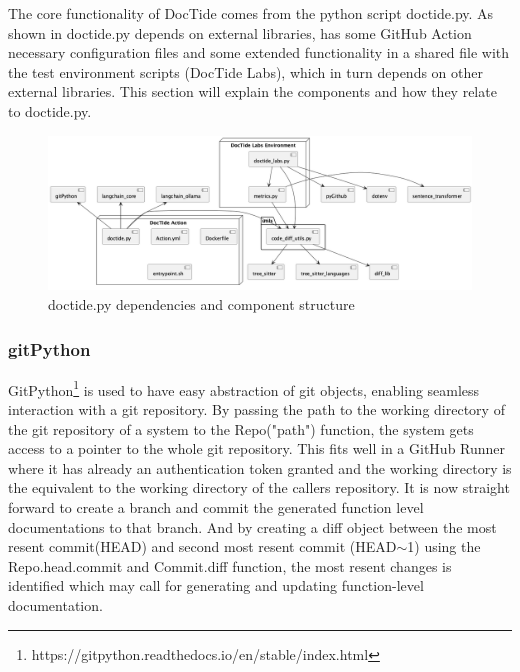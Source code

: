 The core functionality of DocTide comes from the python script doctide.py. As shown in  doctide.py depends on external libraries, has some GitHub Action necessary configuration files and some extended functionality in a shared file with the test environment scripts (DocTide Labs), which in turn depends on other external libraries. This section will explain the components and how they relate to doctide.py.

\begin{figure}[H]
\centering
\includegraphics[width=1\linewidth]{Figures/component_diagram.png}
\caption{doctide.py dependencies and component structure}
\label{fig:components}
\end{figure}
\subsubsection*{gitPython}
GitPython\footnote{https://gitpython.readthedocs.io/en/stable/index.html} is used to have easy abstraction of git objects, enabling seamless interaction with a git repository. By passing the path to the working directory of the git repository of a system to the Repo("path") function, the system gets access to a pointer to the whole git repository. This fits well in a GitHub Runner where it has already an authentication token granted and the working directory is the equivalent to the working directory of the callers repository. It is now straight forward to create a branch and commit the generated function level documentations to that branch. And by creating a diff object between the most resent commit(HEAD) and second most resent commit (HEAD\(\sim \)1) using the Repo.head.commit and Commit.diff function, the most resent changes is identified which may call for generating and updating function-level documentation.
